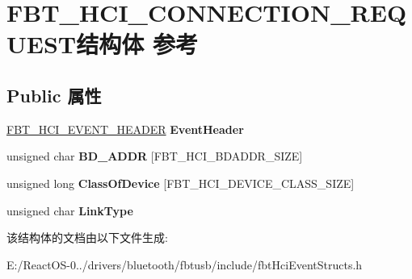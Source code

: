 \hypertarget{struct_f_b_t___h_c_i___c_o_n_n_e_c_t_i_o_n___r_e_q_u_e_s_t}{}\section{F\+B\+T\+\_\+\+H\+C\+I\+\_\+\+C\+O\+N\+N\+E\+C\+T\+I\+O\+N\+\_\+\+R\+E\+Q\+U\+E\+S\+T结构体 参考}
\label{struct_f_b_t___h_c_i___c_o_n_n_e_c_t_i_o_n___r_e_q_u_e_s_t}
\subsection*{Public 属性}
\begin{DoxyCompactItemize}
\item 
\mbox{\label{struct_f_b_t___h_c_i___c_o_n_n_e_c_t_i_o_n___r_e_q_u_e_s_t_a535039118424104481e7a1b709b5c985}} 
\hyperlink{struct_f_b_t___h_c_i___e_v_e_n_t___h_e_a_d_e_r}{F\+B\+T\+\_\+\+H\+C\+I\+\_\+\+E\+V\+E\+N\+T\+\_\+\+H\+E\+A\+D\+ER} {\bfseries Event\+Header}
\item 
\mbox{\label{struct_f_b_t___h_c_i___c_o_n_n_e_c_t_i_o_n___r_e_q_u_e_s_t_a8dc059380199fabf581a75c3e676f925}} 
unsigned char {\bfseries B\+D\+\_\+\+A\+D\+DR} \mbox{[}F\+B\+T\+\_\+\+H\+C\+I\+\_\+\+B\+D\+A\+D\+D\+R\+\_\+\+S\+I\+ZE\mbox{]}
\item 
\mbox{\label{struct_f_b_t___h_c_i___c_o_n_n_e_c_t_i_o_n___r_e_q_u_e_s_t_a722d6b984fb6841758c3acd2dbc323ac}} 
unsigned long {\bfseries Class\+Of\+Device} \mbox{[}F\+B\+T\+\_\+\+H\+C\+I\+\_\+\+D\+E\+V\+I\+C\+E\+\_\+\+C\+L\+A\+S\+S\+\_\+\+S\+I\+ZE\mbox{]}
\item 
\mbox{\label{struct_f_b_t___h_c_i___c_o_n_n_e_c_t_i_o_n___r_e_q_u_e_s_t_a3359ee89876b7ed4273e1df6ffc753ae}} 
unsigned char {\bfseries Link\+Type}
\end{DoxyCompactItemize}


该结构体的文档由以下文件生成\+:\begin{DoxyCompactItemize}
\item 
E\+:/\+React\+O\+S-\/0../drivers/bluetooth/fbtusb/include/fbt\+Hci\+Event\+Structs.\+h\end{DoxyCompactItemize}
